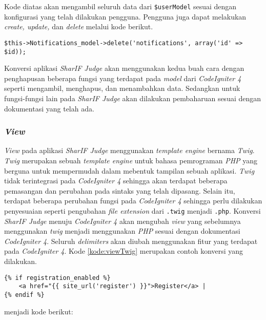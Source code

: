 Kode diatas akan mengambil seluruh data dari \verb|$userModel| sesuai dengan konfigurasi yang telah dilakukan pengguna. Pengguna juga dapat melakukan \textit{create, update,} dan \textit{delete} melalui kode berikut.

\begin{lstlisting}[caption=Contoh kode untuk menghapus data pada model, label=kode:modelCI4Delete]
$this->Notifications_model->delete('notifications', array('id' => $id));

\end{lstlisting}

Konversi aplikasi \textit{SharIF Judge} akan menggunakan kedua buah cara dengan penghapusan beberapa fungsi yang terdapat pada \textit{model} dari \textit{CodeIgniter 4} seperti mengambil, menghapus, dan menambahkan data. Sedangkan untuk fungsi-fungsi lain pada \textit{SharIF Judge} akan dilakukan pembaharuan sesuai dengan dokumentasi yang telah ada.

\subsubsection{\textit{View}}
\textit{View} pada aplikasi \textit{SharIF Judge} menggunakan \textit{template engine} bernama \textit{Twig}. \textit{Twig} merupakan sebuah \textit{template engine} untuk bahasa pemrograman \textit{PHP} yang berguna untuk mempermudah dalam mebentuk tampilan sebuah aplikasi. \textit{Twig} tidak terintegrasi pada \textit{CodeIgniter 4} sehingga akan terdapat beberapa pemasangan dan perubahan pada sintaks yang telah dipasang. Selain itu, terdapat beberapa perubahan fungsi pada \textit{CodeIgniter 4} sehingga perlu dilakukan penyesuaian seperti pengubahan \textit{file extension} dari \texttt{.twig} menjadi \texttt{.php}. Konversi \textit{SharIF Judge} menuju \textit{CodeIgniter 4} akan mengubah \textit{view} yang sebelumnya menggunakan \textit{twig} menjadi menggunakan \textit{PHP} sesuai dengan dokumentasi \textit{CodeIgniter 4}. Seluruh \textit{delimiters} akan diubah menggunakan fitur yang terdapat pada \textit{CodeIgniter 4}. Kode \ref{kode:viewTwig} merupakan contoh konversi yang dilakukan.

\begin{lstlisting}[caption=Contoh \textit{view} menggunakan \textit{twig}, label=kode:viewTwig]
{% if registration_enabled %}
	<a href="{{ site_url('register') }}">Register</a> |
{% endif %}
\end{lstlisting}

menjadi kode berikut:

